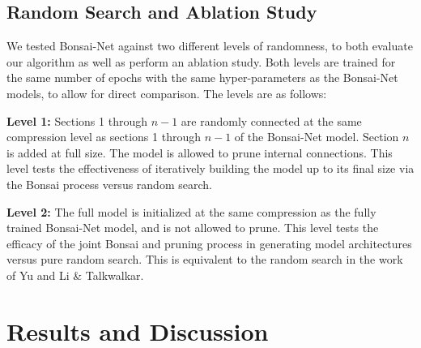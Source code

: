 \documentclass[10pt,twocolumn,letterpaper]{article}
\begin{document}
\subsection{Random Search and Ablation Study}
We tested Bonsai-Net against two different levels of randomness, to both evaluate our algorithm as well as perform an ablation study. Both levels are trained for the same number of epochs with the same hyper-parameters as the Bonsai-Net models, to allow for direct comparison. The levels are as follows:

\textbf{Level 1:} Sections 1 through $n-1$ are randomly connected at the same compression level as sections 1 through $n-1$ of the Bonsai-Net model. Section $n$ is added at full size. The model is allowed to prune internal connections.  This level tests the effectiveness of iteratively building the model up to its final size via the Bonsai process versus random search.

\textbf{Level 2:}  The full model is initialized at the same compression as the fully trained Bonsai-Net model, and is not allowed to prune. This level tests the efficacy of the joint Bonsai and pruning process in generating model architectures versus pure random search. This is equivalent to the random search in the work of Yu \etal and Li \& Talkwalkar. 

\section{Results and Discussion}
\end{document}
